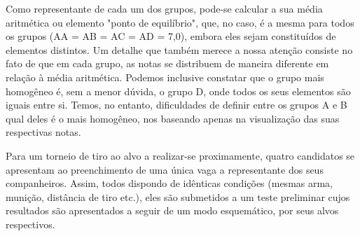 \vskip0.3cm
Como representante de cada um dos grupos, pode-se calcular  a  sua média  aritméti\-ca  ou elemento  "ponto  de  equilíbrio",  que,  no  caso,  é  a mesma para todos os grupos (AA =  AB = AC = AD = 7,0), embora eles sejam constituídos de elementos distintos. Um detalhe que também merece a nossa atenção consiste no fato de que em cada grupo, as notas se distribuem de maneira diferente em relação à média aritmética. Podemos inclusive constatar que o grupo mais homogêneo é, sem a menor dúvida, o grupo D, onde todos os seus elementos são iguais entre si. Temos, no entanto, dificuldades de definir entre os grupos A e B qual deles é o mais homogêneo, nos baseando apenas na visualização das suas respectivas notas.\vskip0.3cm

Para um torneio de tiro ao alvo a realizar-se proximamente, quatro candidatos se apresentam ao preenchimento de uma única vaga a representante dos seus companheiros. Assim, todos dispondo de idênticas condições (mesmas arma, munição, distância de tiro etc.), eles são submetidos a um teste preliminar cujos resultados são apresentados a seguir de um modo esquemático, por seus alvos respectivos.


